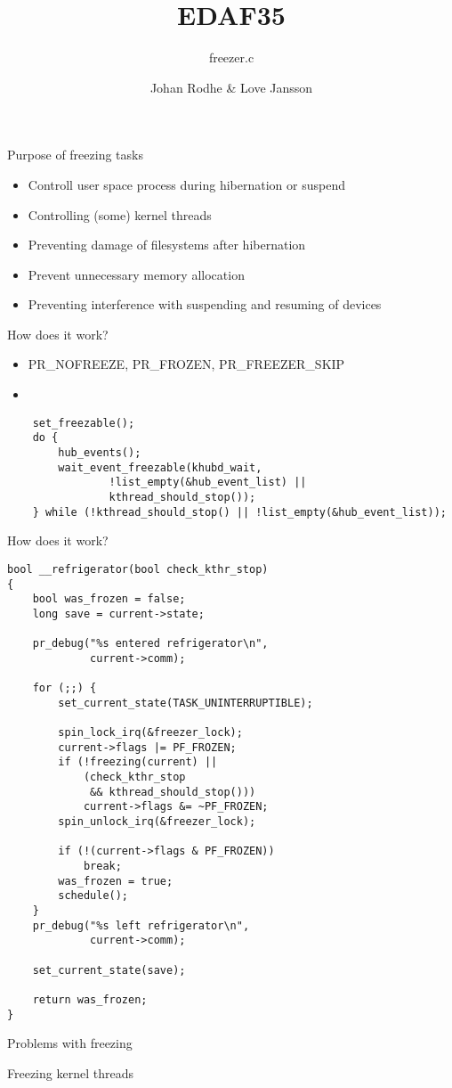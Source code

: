 \documentclass[11pt]{beamer}
\author{Johan Rodhe \& Love Jansson}
\title{EDAF35}
\subtitle{freezer.c}
\begin{document}
\lstset{language=C, basicstyle=\tiny}
\begin{frame}
\titlepage
\end{frame}

\begin{frame}{Purpose of freezing tasks}
\begin{itemize}
\item Controll user space process during hibernation or suspend
\item Controlling (some) kernel threads
\item Preventing damage of filesystems after hibernation
\item Prevent unnecessary memory allocation
\item Preventing interference with suspending and resuming of devices
\end{itemize}
\end{frame}

\begin{frame}[fragile]{How does it work?}
\begin{itemize}
\item PR\_NOFREEZE, PR\_FROZEN, PR\_FREEZER\_SKIP
\item 
\end{itemize}
\begin{lstlisting}
	set_freezable();
	do {
	    hub_events();
	    wait_event_freezable(khubd_wait,
	            !list_empty(&hub_event_list) ||
	            kthread_should_stop());
	} while (!kthread_should_stop() || !list_empty(&hub_event_list));
\end{lstlisting}
\end{frame}

\begin{frame}[fragile]{How does it work?}
\begin{lstlisting}
bool __refrigerator(bool check_kthr_stop)
{
    bool was_frozen = false;
    long save = current->state;

    pr_debug("%s entered refrigerator\n",
             current->comm);

    for (;;) {
        set_current_state(TASK_UNINTERRUPTIBLE);

        spin_lock_irq(&freezer_lock);
        current->flags |= PF_FROZEN;
        if (!freezing(current) ||
            (check_kthr_stop
             && kthread_should_stop()))
            current->flags &= ~PF_FROZEN;
        spin_unlock_irq(&freezer_lock);

        if (!(current->flags & PF_FROZEN))
            break;
        was_frozen = true;
        schedule();
    }
    pr_debug("%s left refrigerator\n",
             current->comm);

    set_current_state(save);

    return was_frozen;
}
\end{lstlisting}
\end{frame}

\begin{frame}{Problems with freezing}

\end{frame}

\begin{frame}{Freezing kernel threads}

\end{frame}
\end{document}
